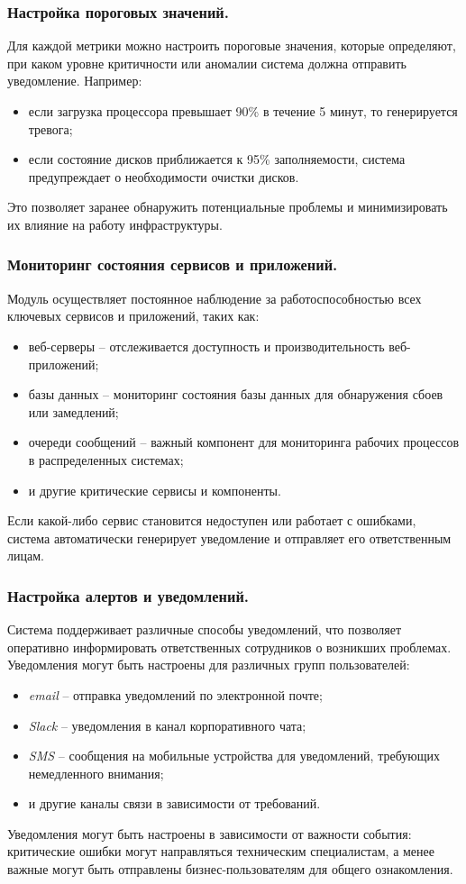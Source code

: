 \subsubsection{Настройка пороговых значений.} Для каждой метрики можно настроить пороговые значения, которые определяют, при каком уровне критичности или аномалии система должна отправить уведомление. Например:
\begin{itemize}
    \item если загрузка процессора превышает 90\% в течение 5 минут, то генерируется тревога;
    \item если состояние дисков приближается к 95\% заполняемости, система предупреждает о необходимости очистки дисков.
\end{itemize}
Это позволяет заранее обнаружить потенциальные проблемы и минимизировать их влияние на работу инфраструктуры.

\subsubsection{Мониторинг состояния сервисов и приложений.} Модуль осуществляет постоянное наблюдение за работоспособностью всех ключевых сервисов и приложений, таких как:
\begin{itemize}
    \item веб-серверы -- отслеживается доступность и производительность веб-приложений;
    \item базы данных -- мониторинг состояния базы данных для обнаружения сбоев или замедлений;
    \item очереди сообщений -- важный компонент для мониторинга рабочих процессов в распределенных системах;
    \item и другие критические сервисы и компоненты.
\end{itemize}
Если какой-либо сервис становится недоступен или работает с ошибками, система автоматически генерирует уведомление и отправляет его ответственным лицам.

\subsubsection{Настройка алертов и уведомлений.} Система поддерживает различные способы уведомлений, что позволяет оперативно информировать ответственных сотрудников о возникших проблемах. Уведомления могут быть настроены для различных групп пользователей:
\begin{itemize}
    \item \textit{email} -- отправка уведомлений по электронной почте;
    \item \textit{Slack} -- уведомления в канал корпоративного чата;
    \item \textit{SMS} -- сообщения на мобильные устройства для уведомлений, требующих немедленного внимания;
    \item и другие каналы связи в зависимости от требований.
\end{itemize}
Уведомления могут быть настроены в зависимости от важности события: критические ошибки могут направляться техническим специалистам, а менее важные могут быть отправлены бизнес-пользователям для общего ознакомления.

